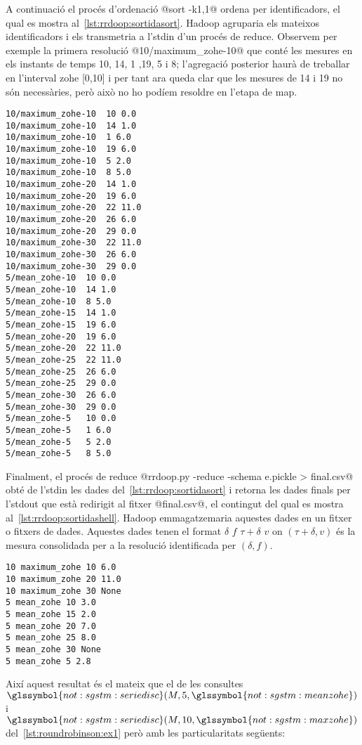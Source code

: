 A continuació el procés d'ordenació @sort -k1,1@ ordena per
identificadors, el qual es mostra
al~\autoref{lst:rrdoop:sortidasort}. Hadoop agruparia els mateixos
identificadors i els transmetria a l'stdin d'un procés de reduce.
Observem per exemple la primera resolució @10/maximum_zohe-10@ que
conté les mesures en els instants de temps 10, 14, 1 ,19, 5 i 8;
l'agregació posterior haurà de treballar en l'interval \gls{zohe}
[0,10] i per tant ara queda clar que les mesures de 14 i 19 no són
necessàries, però això no ho podíem resoldre en l'etapa de map.
\begin{lstlisting}[style=stdout,caption=Sortida del procés d'ordenació,label=lst:rrdoop:sortidasort]
10/maximum_zohe-10	10 0.0
10/maximum_zohe-10	14 1.0
10/maximum_zohe-10	1 6.0
10/maximum_zohe-10	19 6.0
10/maximum_zohe-10	5 2.0
10/maximum_zohe-10	8 5.0
10/maximum_zohe-20	14 1.0
10/maximum_zohe-20	19 6.0
10/maximum_zohe-20	22 11.0
10/maximum_zohe-20	26 6.0
10/maximum_zohe-20	29 0.0
10/maximum_zohe-30	22 11.0
10/maximum_zohe-30	26 6.0
10/maximum_zohe-30	29 0.0
5/mean_zohe-10	10 0.0
5/mean_zohe-10	14 1.0
5/mean_zohe-10	8 5.0
5/mean_zohe-15	14 1.0
5/mean_zohe-15	19 6.0
5/mean_zohe-20	19 6.0
5/mean_zohe-20	22 11.0
5/mean_zohe-25	22 11.0
5/mean_zohe-25	26 6.0
5/mean_zohe-25	29 0.0
5/mean_zohe-30	26 6.0
5/mean_zohe-30	29 0.0
5/mean_zohe-5	10 0.0
5/mean_zohe-5	1 6.0
5/mean_zohe-5	5 2.0
5/mean_zohe-5	8 5.0
\end{lstlisting}


Finalment, el procés de reduce %
@rrdoop.py -reduce -schema e.pickle > final.csv@ obté de l'stdin les
dades del~\autoref{lst:rrdoop:sortidasort} i retorna les dades finals
per l'stdout que està redirigit al fitxer @final.csv@, el contingut
del qual es mostra al~\autoref{lst:rrdoop:sortidashell}.  Hadoop
emmagatzemaria aquestes dades en un fitxer o fitxers de dades.
Aquestes dades tenen el format $\delta$ $f$ $\tau+\delta$ $v$ on
$(\tau+\delta,v)$ és la mesura consolidada per a la resolució
identificada per $(\delta,f)$.

\begin{lstlisting}[style=file,caption=Dades de sortida final.csv,label=lst:rrdoop:sortidashell]
10 maximum_zohe	10 6.0
10 maximum_zohe	20 11.0
10 maximum_zohe	30 None
5 mean_zohe	10 3.0
5 mean_zohe	15 2.0
5 mean_zohe	20 7.0
5 mean_zohe	25 8.0
5 mean_zohe	30 None
5 mean_zohe	5 2.8
\end{lstlisting}

Així aquest resultat és el mateix que el de les consultes
$\glssymbol{not:sgstm:seriedisc}(M,5,\glssymbol{not:sgstm:meanzohe})$
i
$\glssymbol{not:sgstm:seriedisc}(M,10,\glssymbol{not:sgstm:maxzohe})$
del~\autoref{lst:roundrobinson:ex1} però amb les particularitats
següents:

